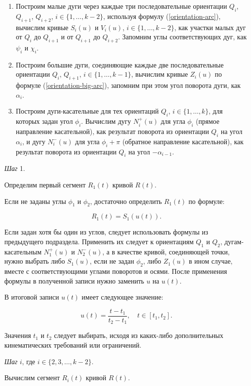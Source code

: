 \begin{enumerate}
\item Построим малые дуги через каждые три последовательные ориентации $Q_i$, $Q_{i+1}$, $Q_{i+2}$,
$i \in \{1,\dots,k-2\}$, используя формулу (\ref{orientation-arc}), вычислим кривые $S_i(u)$ и $V_i(u)$,
$i \in \{1,\dots,k-2\}$, как участки малых дуг от $Q_i$ до $Q_{i+1}$ и от $Q_{i+1}$ до $Q_{i+2}$. Запомним углы
соответствующих дуг, как $\psi_i$ и $\chi_i$.
\item Построим большие дуги, соединяющие каждые две последовательные ориентации $Q_i$, $Q_{i+1}$, $i \in \{1,\dots,k-1\}$,
вычислим кривые $Z_i(u)$ по формуле (\ref{orientation-big-arc}), запомним при этом угол поворота дуги, как $\alpha_i$.
\item Построим дуги-касательные для тех ориентаций $Q_i$, $i \in \{1,\dots,k\}$, для которых задан угол $\phi_i$.
Вычислим дугу $N_i^+(u)$ для угла $\phi_i$ (прямое направление касательной), как результат поворота из ориентации $Q_i$
на угол $\alpha_i$, и дугу $N_i^-(u)$ для угла $\phi_i+\pi$ (обратное направление касательной), как результат поворота
из ориентации $Q_i$ на угол $-\alpha_{i-1}$.
\end{enumerate}

\bigskip
\textit{Шаг} 1.

Определим первый сегмент $R_1(t)$ кривой $R(t)$.

Если не заданы углы $\phi_1$ и $\phi_2$, достаточно определить $R_1(t)$ по формуле:

$$
R_1(t)=S_1(u(t)).
$$

Если задан хотя бы один из углов, следует использовать формулы из предыдущего подраздела. Применить их следует к
ориентациям $Q_1$ и $Q_2$, дугам-касательным $N_1^+(u)$ и $N_2^-(u)$, а в качестве кривой, соединяющей точки, нужно
выбрать либо $S_1(u)$, если не задан $\phi_2$, либо $Z_1(u)$ в ином случае, вместе с соответствующими углами
поворотов и осями. После применения формулы в полученной записи нужно заменить $u$ на $u(t)$.

В итоговой записи $u(t)$ имеет следующее значение:

$$
u(t)=\frac{t-t_1}{t_2-t_1}, \quad t \in [t_1,t_2].
$$

Значения $t_1$ и $t_2$ следует выбирать, исходя из каких-либо дополнительных кинематических требований или ограничений.

\bigskip
\textit{Шаг} $i$, где $i \in \{2,3,\dots,k-2\}$.

Вычислим сегмент $R_i(t)$ кривой $R(t)$.


